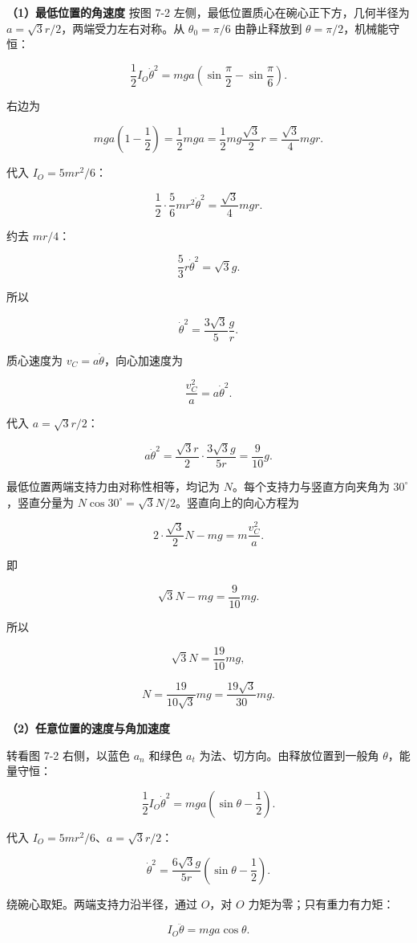 \documentclass[12pt,a4paper,UTF8]{ctexart}
\begin{document}
\textbf{（1）最低位置的角速度} 按图 7-2
左侧，最低位置质心在碗心正下方，几何半径为
\(a=\sqrt3r/2\)，两端受力左右对称。从 \(\theta_0=\pi/6\) 由静止释放到
\(\theta=\pi/2\)，机械能守恒：

\[\frac12I_O\dot\theta^2
=mga\left(\sin\frac\pi2-\sin\frac\pi6\right).\]

右边为

\[mga\left(1-\frac12\right)=\frac12mga
=\frac12mg\frac{\sqrt3}{2}r
=\frac{\sqrt3}{4}mgr.\]

代入 \(I_O=5mr^2/6\)：

\[\frac12\cdot\frac56mr^2\dot\theta^2
=\frac{\sqrt3}{4}mgr.\]

约去 \(mr/4\)：

\[\frac53r\dot\theta^2=\sqrt3g.\]

所以

\[\boxed{\dot\theta^2=\frac{3\sqrt3}{5}\frac gr}.\]

质心速度为 \(v_C=a\dot\theta\)，向心加速度为

\[\frac{v_C^2}{a}=a\dot\theta^2.\]

代入 \(a=\sqrt3r/2\)：

\[a\dot\theta^2
=\frac{\sqrt3r}{2}\cdot\frac{3\sqrt3g}{5r}
=\frac9{10}g.\]

最低位置两端支持力由对称性相等，均记为 \(N\)。每个支持力与竖直方向夹角为
\(30^\circ\)，竖直分量为
\(N\cos30^\circ=\sqrt3N/2\)。竖直向上的向心方程为

\[2\cdot\frac{\sqrt3}{2}N-mg=m\frac{v_C^2}{a}.\]

即

\[\sqrt3N-mg=\frac9{10}mg.\]

所以

\[\sqrt3N=\frac{19}{10}mg,\]

\[\boxed{N=\frac{19}{10\sqrt3}mg=\frac{19\sqrt3}{30}mg}.\]

\textbf{（2）任意位置的速度与角加速度}

转看图 7-2 右侧，以蓝色 \(a_n\) 和绿色 \(a_t\)
为法、切方向。由释放位置到一般角 \(\theta\)，能量守恒：

\[\frac12I_O\dot\theta^2
=mga\left(\sin\theta-\frac12\right).\]

代入 \(I_O=5mr^2/6\)、\(a=\sqrt3r/2\)：

\[\boxed{
\dot\theta^2
=\frac{6\sqrt3g}{5r}\left(\sin\theta-\frac12\right)
}.\]

绕碗心取矩。两端支持力沿半径，通过 \(O\)，对 \(O\)
力矩为零；只有重力有力矩：

\[I_O\ddot\theta=mga\cos\theta.\]
\end{document}
